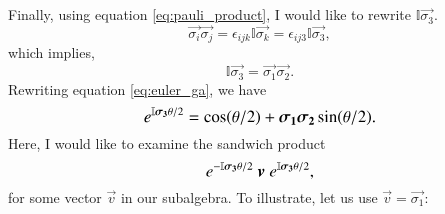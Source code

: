 \\ \\
Finally, using equation \eqref{eq:pauli_product}, I would like to rewrite  $\mathbb{I} \vec{\sigma_3}$.
$$ \vec{\sigma_i} \vec{\sigma_j} = \epsilon_{ijk} \mathbb{I} \vec{\sigma_k} = \epsilon_{ij3} \mathbb{I} \vec{\sigma_3},$$
which implies,
$$ \mathbb{I} \vec{\sigma_3 } = \vec{\sigma_1 } \vec{\sigma_2 }. $$
Rewriting equation \eqref{eq:euler_ga}, we have
\begin{equation} \label{eq:euler_ga_rewritten}
	\large  \exp{ \mathbb{I} \vec{\sigma_3} \theta / 2} = \cos(\theta/2) + \vec{\sigma_1} \vec{\sigma_2} \sin(\theta/2).
\end{equation}
Here, I would like to examine the sandwich product
\begin{equation} \label{eq:sandwich_product}
	\large  \exp{ -\mathbb{I} \vec{\sigma_3}  \theta / 2} \ \vec{v}  \
	\exp{ \mathbb{I} \vec{\sigma_3} \theta / 2},
\end{equation}
for some vector $\vec{v}$ in our subalgebra. To illustrate, let us use $\vec{v} =  \vec{\sigma_1}$:
